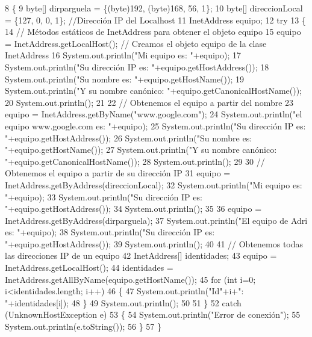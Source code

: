 \begin{DoxyCode}
8     \{
9         byte[] dirparguela = \{(byte)192, (byte)168, 56, 1\};
10         byte[] direccionLocal = \{127, 0, 0, 1\}; \textcolor{comment}{//Dirección IP del Localhost}
11         InetAddress equipo;
12         \textcolor{keywordflow}{try}
13         \{
14             \textcolor{comment}{// Métodos estáticos de InetAddress para obtener el objeto equipo}
15             equipo = InetAddress.getLocalHost();  \textcolor{comment}{// Creamos el objeto equipo de la clase InetAddress}
16             System.out.println(\textcolor{stringliteral}{"Mi equipo es: "}+equipo);
17             System.out.println(\textcolor{stringliteral}{"Su dirección IP es: "}+equipo.getHostAddress());
18             System.out.println(\textcolor{stringliteral}{"Su nombre es: "}+equipo.getHostName());
19             System.out.println(\textcolor{stringliteral}{"Y su nombre canónico: "}+equipo.getCanonicalHostName());
20             System.out.println();
21 
22             \textcolor{comment}{// Obtenemos el equipo a partir del nombre}
23             equipo = InetAddress.getByName(\textcolor{stringliteral}{"www.google.com"});
24             System.out.println(\textcolor{stringliteral}{"el equipo www.google.com es: "}+equipo);
25             System.out.println(\textcolor{stringliteral}{"Su dirección IP es: "}+equipo.getHostAddress());
26             System.out.println(\textcolor{stringliteral}{"Su nombre es: "}+equipo.getHostName());
27             System.out.println(\textcolor{stringliteral}{"Y su nombre canónico: "}+equipo.getCanonicalHostName());
28             System.out.println();
29 
30             \textcolor{comment}{// Obtenemos el equipo a partir de su dirección IP}
31             equipo = InetAddress.getByAddress(direccionLocal);
32             System.out.println(\textcolor{stringliteral}{"Mi equipo es: "}+equipo);
33             System.out.println(\textcolor{stringliteral}{"Su dirección IP es: "}+equipo.getHostAddress());
34             System.out.println();
35 
36             equipo = InetAddress.getByAddress(dirparguela);
37             System.out.println(\textcolor{stringliteral}{"El equipo de Adri es: "}+equipo);
38             System.out.println(\textcolor{stringliteral}{"Su dirección IP es: "}+equipo.getHostAddress());
39             System.out.println();
40             
41             \textcolor{comment}{// Obtenemos todas las direcciones IP de un equipo}
42             InetAddress[] identidades;
43             equipo = InetAddress.getLocalHost();
44             identidades = InetAddress.getAllByName(equipo.getHostName());
45             \textcolor{keywordflow}{for} (\textcolor{keywordtype}{int} i=0; i<identidades.length; i++)
46             \{
47                 System.out.println(\textcolor{stringliteral}{"Id"}+i+\textcolor{stringliteral}{": "}+identidades[i]);
48             \}
49             System.out.println();
50 
51         \}
52         \textcolor{keywordflow}{catch} (UnknownHostException e)
53         \{
54             System.out.println(\textcolor{stringliteral}{"Error de conexión"});
55             System.out.println(e.toString());
56         \}
57     \}
\end{DoxyCode}
